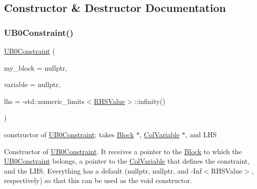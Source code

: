 \subsection{Constructor \& Destructor Documentation}
\mbox{\label{class_s_m_spp__di__unipi__it_1_1_u_b0_constraint_ae251cae844f2ccd1c920f3c49d1ed5a0}} 
\subsubsection{\texorpdfstring{U\+B0\+Constraint()}{UB0Constraint()}}
{\footnotesize\ttfamily \mbox{\hyperlink{class_s_m_spp__di__unipi__it_1_1_u_b0_constraint}{U\+B0\+Constraint}} (\begin{DoxyParamCaption}\item[{\mbox{\hyperlink{class_s_m_spp__di__unipi__it_1_1_block}{Block}} $\ast$}]{my\+\_\+block = {\ttfamily nullptr},  }\item[{\mbox{\hyperlink{class_s_m_spp__di__unipi__it_1_1_col_variable}{Col\+Variable}} $\ast$const}]{variable = {\ttfamily nullptr},  }\item[{\mbox{\hyperlink{class_s_m_spp__di__unipi__it_1_1_row_constraint_a34abd4b01d3a2024be5f6d13dd88779f}{c\+\_\+\+R\+H\+S\+Value}}}]{lhs = {\ttfamily -\/std\+:\+:numeric\+\_\+limits$<$\mbox{\hyperlink{class_s_m_spp__di__unipi__it_1_1_row_constraint_a8813536ab3b13a81c8e83a999ade3bd8}{R\+H\+S\+Value}}$>$\+:\+:infinity()} }\end{DoxyParamCaption})\hspace{0.3cm}{\ttfamily [inline]}}



constructor of \mbox{\hyperlink{class_s_m_spp__di__unipi__it_1_1_u_b0_constraint}{U\+B0\+Constraint}}\+: takes \mbox{\hyperlink{class_s_m_spp__di__unipi__it_1_1_block}{Block}} $\ast$, \mbox{\hyperlink{class_s_m_spp__di__unipi__it_1_1_col_variable}{Col\+Variable}} $\ast$, and L\+HS 

Constructor of \mbox{\hyperlink{class_s_m_spp__di__unipi__it_1_1_u_b0_constraint}{U\+B0\+Constraint}}. It receives a pointer to the \mbox{\hyperlink{class_s_m_spp__di__unipi__it_1_1_block}{Block}} to which the \mbox{\hyperlink{class_s_m_spp__di__unipi__it_1_1_u_b0_constraint}{U\+B0\+Constraint}} belongs, a pointer to the \mbox{\hyperlink{class_s_m_spp__di__unipi__it_1_1_col_variable}{Col\+Variable}} that defines the constraint, and the L\+HS. Everything has a default (nullptr, nullptr, and -\/\+Inf$<$\+R\+H\+S\+Value$>$, respectively) so that this can be used as the void constructor. 


